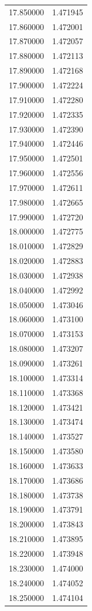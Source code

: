 \begin{tabular}{rr}
17.850000 & 1.471945 \\
17.860000 & 1.472001 \\
17.870000 & 1.472057 \\
17.880000 & 1.472113 \\
17.890000 & 1.472168 \\
17.900000 & 1.472224 \\
17.910000 & 1.472280 \\
17.920000 & 1.472335 \\
17.930000 & 1.472390 \\
17.940000 & 1.472446 \\
17.950000 & 1.472501 \\
17.960000 & 1.472556 \\
17.970000 & 1.472611 \\
17.980000 & 1.472665 \\
17.990000 & 1.472720 \\
18.000000 & 1.472775 \\
18.010000 & 1.472829 \\
18.020000 & 1.472883 \\
18.030000 & 1.472938 \\
18.040000 & 1.472992 \\
18.050000 & 1.473046 \\
18.060000 & 1.473100 \\
18.070000 & 1.473153 \\
18.080000 & 1.473207 \\
18.090000 & 1.473261 \\
18.100000 & 1.473314 \\
18.110000 & 1.473368 \\
18.120000 & 1.473421 \\
18.130000 & 1.473474 \\
18.140000 & 1.473527 \\
18.150000 & 1.473580 \\
18.160000 & 1.473633 \\
18.170000 & 1.473686 \\
18.180000 & 1.473738 \\
18.190000 & 1.473791 \\
18.200000 & 1.473843 \\
18.210000 & 1.473895 \\
18.220000 & 1.473948 \\
18.230000 & 1.474000 \\
18.240000 & 1.474052 \\
18.250000 & 1.474104 \\

\end{tabular}
